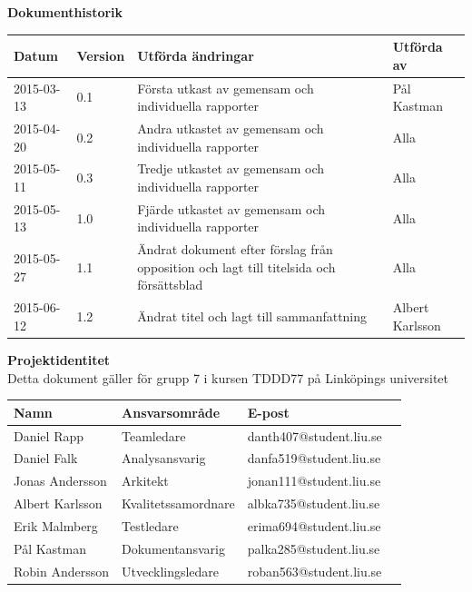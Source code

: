 \documentclass{article}
\begin{document}




\newpage
\begin{flushleft}
  {\Large \textbf{Dokumenthistorik}}\\[0.5ex]
  \begin{center}
  \vspace{3mm}
    \begin{tabular}{ | l | l | p{5cm} | l |}
    \hline
    \textbf{Datum} & \textbf{Version} & \textbf{Utförda ändringar} & \textbf{Utförda av} \\ \hline
    2015-03-13 & 0.1 & Första utkast av gemensam och individuella rapporter & Pål Kastman \\ \hline
    2015-04-20 & 0.2 & Andra utkastet av gemensam och individuella rapporter & Alla \\ \hline
    2015-05-11 & 0.3 & Tredje utkastet av gemensam och individuella rapporter & Alla \\ \hline
	2015-05-13 & 1.0 & Fjärde utkastet av gemensam och individuella rapporter & Alla \\ \hline    
	2015-05-27 & 1.1 & Ändrat dokument efter förslag från opposition och lagt till titelsida och försättsblad & Alla \\ \hline    
	2015-06-12 & 1.2 & Ändrat titel och lagt till sammanfattning & Albert Karlsson \\ \hline

    \end{tabular}
  \end{center}
\end{flushleft}

\hfill

\begin{flushleft}
  {\Large \textbf{Projektidentitet}}\\[0.5ex]
  {\small} Detta dokument gäller för grupp 7  i kursen TDDD77 på Linköpings universitet
  \begin{center}
    \begin{tabular}{ | l | l | p{5cm} | l |}
    \hline
    \textbf{Namn} & \textbf{Ansvarsområde} & \textbf{E-post} \\ \hline
    Daniel Rapp & Teamledare & danth407@student.liu.se \\ \hline
    Daniel Falk & Analysansvarig & danfa519@student.liu.se \\ \hline
    Jonas Andersson & Arkitekt & jonan111@student.liu.se \\ \hline
    Albert Karlsson & Kvalitetssamordnare & albka735@student.liu.se \\ \hline
    Erik Malmberg & Testledare & erima694@student.liu.se \\ \hline
    Pål Kastman & Dokumentansvarig & palka285@student.liu.se \\ \hline
    Robin Andersson & Utvecklingsledare & roban563@student.liu.se \\ \hline

    \end{tabular}
\end{center}
\end{flushleft}
\end{document}
